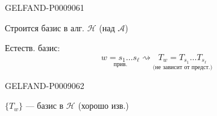 \begin{GelfandAdjacentEvidence}{GELFAND-P000906}{1}

Строится базис в алг. $\mathcal H$ (над $\mathcal A$)

Естеств. базис:
\begin{equation*}
\underset{\text{прив.}}{w=s_1\ldots s_\ell}
\rightsquigarrow
\underset{\text{(не зависит от предст.)}}{T_w=T_{s_1}\ldots T_{s_\ell}}
\tag{6}
\end{equation*}
\end{GelfandAdjacentEvidence}
\begin{GelfandAdjacentEvidence}{GELFAND-P000906}{2}


$\{T_w\}$ --- базис в $\mathcal H$ (хорошо изв.)

\end{GelfandAdjacentEvidence}
